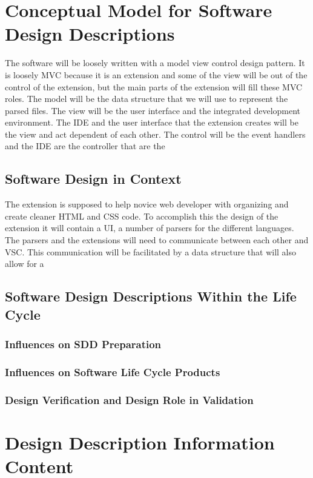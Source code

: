 \documentclass[letterpaper,10pt,titlepage,draftclsnofoot,onecolumn,onesided] {IEEEtran}
\begin{document}
\section{Conceptual Model for Software Design Descriptions}
The software will be loosely written with a model view control design pattern.
It is loosely MVC because it is an extension and some of the view will be out of the control of the extension, but the main parts of the extension will fill these MVC roles.
The model will be the data structure that we will use to represent the parsed files. 
The view will be the user interface and the integrated development environment.
The IDE and the user interface that the extension creates will be the view and act dependent of each other.
The control will be the event handlers and the IDE are the controller that are the 

\subsection{Software Design in Context}
The extension is supposed to help novice web developer with organizing and create cleaner HTML and CSS code. 
To accomplish this the design of the extension it will contain a UI, a number of parsers for the different languages.
The parsers and the extensions will need to communicate between each other and VSC.
This communication will be facilitated by a data structure that will also allow for a 



\subsection{Software Design Descriptions Within the Life Cycle}
\subsubsection{Influences on SDD Preparation}
\subsubsection{Influences on Software Life Cycle Products}
\subsubsection{Design Verification and Design Role in Validation}

\section{Design Description Information Content}
\end{document}
